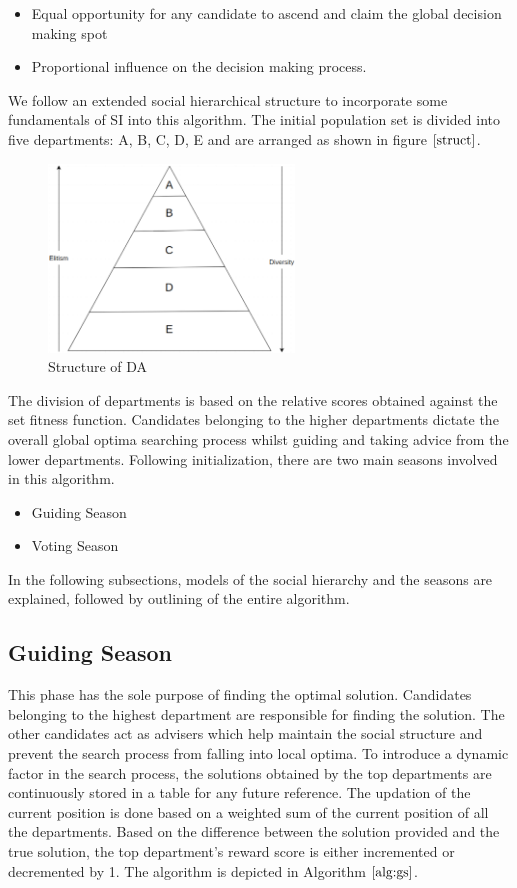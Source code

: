 \documentclass[conference]{IEEEtran}
\begin{document}
\begin{itemize}
\item Equal opportunity for any candidate to ascend and claim the global decision making spot
\item Proportional influence on the decision making process.

\end{itemize}

We follow an extended social hierarchical structure to incorporate some fundamentals of SI into this algorithm. The initial population set is divided into five departments: A, B, C, D, E and are arranged as shown in figure $\ref{struct}$.

\begin{figure}[!t]
\centering
\includegraphics[height=5cm]{struct.png}
\caption{Structure of DA}
\label{struct}
\end{figure}

The division of departments is based on the relative scores obtained against the set fitness function. Candidates belonging to the higher departments dictate the overall global optima searching process whilst guiding and taking advice from the lower departments. Following initialization, there are two main seasons involved in this algorithm.
\begin{itemize}
\item Guiding Season
\item Voting Season
\end{itemize}

In the following subsections, models of the social hierarchy and the seasons are explained, followed by outlining of the entire algorithm.  

\subsection{Guiding Season}

This phase has the sole purpose of finding the optimal solution. Candidates belonging to the highest department are responsible for finding the solution. The other candidates act as advisers which help maintain the social structure and prevent the search process from falling into local optima. To introduce a dynamic factor in the search process, the solutions obtained by the top departments are continuously stored in a table for any future reference. The updation of the current position is done based on a weighted sum of the current position of all the departments. Based on the difference between the solution provided and the true solution, the top department's reward score is either incremented or decremented by 1. The algorithm is depicted in Algorithm $\ref{alg:gs}$.
\end{document}
